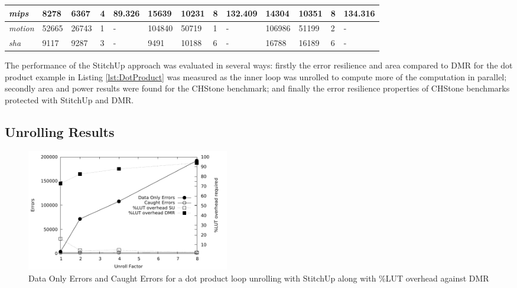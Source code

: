 \begin{table}[t]
\begin{tabular}{@{}|l|l|l|l|l|l|l|l|l|l|l|l|l|@{}}
\textit{mips}       & 8278         & 6367         & 4            & 89.326         & 15639        & 10231        & 8            & 132.409        & 14304        & 10351        & 8            & 134.316        \\ \midrule
\textit{motion}     & 52665        & 26743        & 1            & -              & 104840       & 50719        & 1            & -              & 106986       & 51199        & 2            & -              \\ \midrule
\textit{sha}        & 9117         & 9287         & 3            & -              & 9491         & 10188        & 6            & -              & 16788        & 16189        & 6            & -               \\ \bottomrule
\end{tabular}
\end{table}

The performance of the StitchUp approach was evaluated in several ways:
firstly the error resilience and area compared to DMR for the dot product example in Listing \ref{lst:DotProduct} was
measured as the inner loop was unrolled to compute more of the computation in parallel;
secondly area and power results were found for the CHStone benchmark; and finally the error
resilience properties of CHStone benchmarks protected with StitchUp and DMR.

\subsection{Unrolling Results}
\begin{figure}[h]
\centering
\includegraphics[width=3.5in]{./graphs/dp_unrolling_res.pdf}
\caption{Data Only Errors and Caught Errors for a dot product loop unrolling with StitchUp along with \%LUT overhead against DMR}
\label{fig:dp_unrolling_res}
\end{figure}

